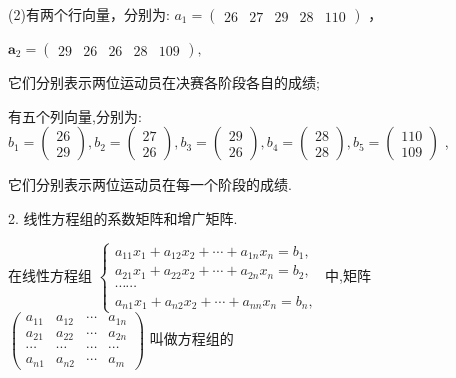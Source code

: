 \documentclass[10pt]{article}
\begin{document}
(2)有两个行向量，分别为: \({a}_{1} = \left( \begin{array}{lllll} {26} & {27} & {29} & {28} & {110} \end{array}\right)\) ，

\({\mathbf{a}}_{2} = \left( \begin{array}{lllll} {29} & {26} & {26} & {28} & {109} \end{array}\right) ,\)

它们分别表示两位运动员在决赛各阶段各自的成绩;

有五个列向量,分别为: \({b}_{1} = \left( \begin{array}{l} {26} \\  {29} \end{array}\right) ,{b}_{2} = \left( \begin{array}{l} {27} \\  {26} \end{array}\right) ,{b}_{3} = \left( \begin{array}{l} {29} \\  {26} \end{array}\right) ,{b}_{4} = \left( \begin{array}{l} {28} \\  {28} \end{array}\right) ,{b}_{5} = \left( \begin{array}{l} {110} \\  {109} \end{array}\right)\) ,

它们分别表示两位运动员在每一个阶段的成绩.

2. 线性方程组的系数矩阵和增广矩阵.

在线性方程组 \(\left\{  \begin{array}{l} {a}_{11}{x}_{1} + {a}_{12}{x}_{2} + \cdots  + {a}_{1n}{x}_{n} = {b}_{1}, \\  {a}_{21}{x}_{1} + {a}_{22}{x}_{2} + \cdots  + {a}_{2n}{x}_{n} = {b}_{2}, \\  \cdots \cdots \\  {a}_{n1}{x}_{1} + {a}_{n2}{x}_{2} + \cdots  + {a}_{nn}{x}_{n} = {b}_{n}, \end{array}\right.\) 中,矩阵 \(\left( \begin{matrix} {a}_{11} & {a}_{12} & \cdots & {a}_{1n} \\  {a}_{21} & {a}_{22} & \cdots & {a}_{2n} \\  \cdots & \cdots & \cdots & \cdots \\  {a}_{n1} & {a}_{n2} & \cdots & {a}_{m} \end{matrix}\right)\) 叫做方程组的
\end{document}
